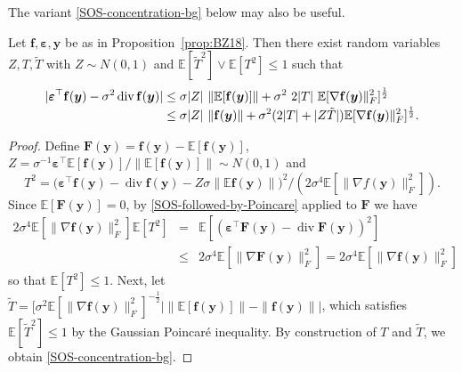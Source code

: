 \documentclass[11pt]{amsart}
\numberwithin{equation}{section}
\numberwithin{equation}{section}
\newcommand\onArxivOrInJournal[2]{#2}
\newcommand{\bes}{\begin{eqnarray*}}
\newcommand{\ees}{\end{eqnarray*}}
\def\E{{\mathbb{E}}}
\def\P{{\mathbb{P}}}
\def\mathbold{\boldsymbol} %
\def\by{\mathbold{y}}\def\yhat{\widehat{y}}\def\ytil{\widetilde{y}}\def\ybar{{\overline y}}\def\vby{{\bf y}}
\def\ep{\varepsilon}\def\eps{\epsilon}\def\veps{\varepsilon}
\def\bep{ {\mathbold{\ep} }}
\DeclareMathOperator{\dv}{div}
\begin{document}
\onArxivOrInJournal{}{
The variant 
\eqref{SOS-concentration-bg} below may also be useful.

\begin{proposition}
    \label{prop:SOS-high-proba-g}
    Let $\mathbf{f}, \bep, \by$ be as in
    Proposition~\ref{prop:BZ18}.
    Then there exist random variables $Z,T,\tilde T$ with
    $Z\sim N(0,1)$
    and $\E[\tilde T^2]\vee \E[T^2]\le 1$ such that
    \begin{align}
        |\bep^\top \mathbf{f}(\by)
        - \sigma^2\dv \mathbf{f}(\by)
        |
        &\le
        \sigma |Z| ~ \|\E[\mathbf{f}(\by)]\|
        + \sigma^2 ~2|T|~\E[\nabla \mathbf{f}(\by)\|_F^2]^{\frac12}
        \\
        &\le
        \sigma |Z|~\|\mathbf{f}(\by)\|
        +
        \smash{
            \sigma^2(2|T|+|Z \tilde T|)
            \E[\nabla \mathbf{f}(\by)\|_F^2]^{\frac12}.
        }
        \label{SOS-concentration-bg}
    \end{align}
\end{proposition}

\begin{proof}
    Define
    $\mathbf{F}(\by) = \mathbf{f}(\by) - \E[\mathbf{f}(\by)]$, $Z = \sigma^{-1}\bep^\top\E[\mathbf{f}(\by)]/\|\E[\mathbf{f}(\by)]\|\sim N(0,1)$  and
    $$T^2=\big(\bep^\top \mathbf{f}(\by) - \dv \mathbf{f}(\by) - Z\sigma \|\E \mathbf{f}(\by)\|\big)^2
          \big/(2\sigma^4\E[\|\nabla f(\by)\|_F^2]).$$
    Since 
    $\E[\mathbf{F}(\by)]=0$, by \eqref{SOS-followed-by-Poincare} applied to $\mathbf{F}$
    we have
    \bes
    2\sigma^4\E[\|\nabla \mathbf{f}(\by)\|_F^2] \E[T^2]
      &=&\E[(\bep^\top \mathbf{F}(\by) - \dv \mathbf{F}(\by))^2]
    \\&\le& 2 \sigma^4 \E[\| \nabla \mathbf{F}(\by)\|_F^2]
    = 2 \sigma^4 \E[\| \nabla \mathbf{f}(\by)\|_F^2]
    \ees
    so that $\E[T^2]\le 1$.
    Next, let $\tilde T =[\sigma^2\E[\|\nabla \mathbf{f}(\by)\|_F^2]^{-\frac12}
    \big|\|\E[\mathbf{f}(\by)]\| - \|\mathbf{f}(\by)\|\big|$, which satisfies
    $\E[\tilde T^2]\le 1$ by the Gaussian Poincar\'e inequality.
    By construction of $T$ and $\tilde T$, we obtain \eqref{SOS-concentration-bg}.
\end{proof}
}

\propSOSmatrix
\end{document}

